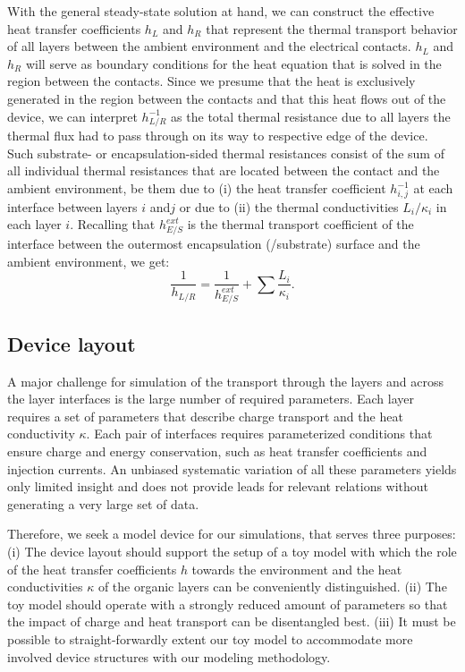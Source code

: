 \documentclass[%
9pt,
 aip,
rsi,%
 amsmath,amssymb,
preprint,%
]{revtex4-1}
\begin{document}
With the general steady-state solution at hand, we can construct the effective heat transfer coefficients $h_{L}$ and $h_{R}$ that represent the thermal transport behavior of all layers between the ambient environment and the electrical contacts. $h_{L}$ and $h_{R}$ will serve as boundary conditions for the heat equation that is solved in the region between the contacts.
Since we presume that the heat is exclusively generated in the region between the contacts and that this heat flows out of the device, we can interpret $h_{L/R}^{-1}$ as the total thermal resistance due to all layers the thermal flux had to pass through on its way to respective edge of the device.
Such substrate- or encapsulation-sided thermal resistances consist of the sum of all individual thermal resistances that are located between the contact and the ambient environment, be them due to (i) the heat transfer coefficient $h_{i,j}^{-1}$ at each interface between layers $i$ and$j$ or due to (ii) the thermal conductivities ${L_i}/{\kappa_i}$ in each layer $i$.  
Recalling that $h_{E/S}^{ext}$ is the thermal transport coefficient of the interface between the outermost encapsulation (/substrate) surface and the ambient environment, we get:
\begin{equation}
\frac{1}{h_{L/R}} = \frac{1}{h_{E/S}^{ext}} + \sum \frac{L_i}{\kappa_i}.
\label{eq:effectiveh}
\end{equation}

\subsection{Device layout}
A major challenge for simulation of the transport through the layers and across the layer interfaces is the large number of required parameters.
Each layer requires a set of parameters that describe charge transport and the heat conductivity $\kappa$. Each pair of interfaces requires parameterized conditions that ensure charge and energy conservation, such as heat transfer coefficients and injection currents. 
An unbiased systematic variation of all these parameters yields only limited insight and does not provide leads for relevant relations without generating a very large set of data.

Therefore, we seek a model device for our simulations, that serves three purposes: 
(i) The device layout should support the setup of a toy model with which the role of the heat transfer coefficients $h$ towards the environment and the heat conductivities $\kappa$ of the organic layers can be conveniently distinguished.
(ii) The toy model should operate with a strongly reduced amount of parameters so that the impact of charge and heat transport can be disentangled best.
(iii) It must be possible to straight-forwardly extent our toy model to accommodate more involved device structures with our modeling methodology.
\end{document}
